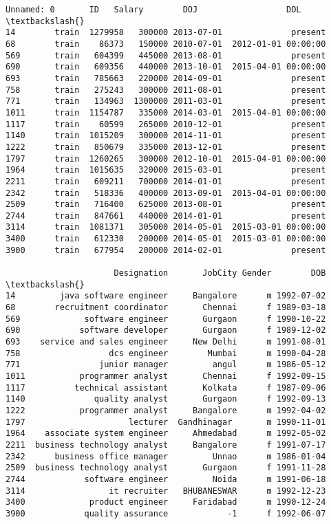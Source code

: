 \documentclass[11pt]{article}
\makeatletter
\newcommand{\boxspacing}{\kern\kvtcb@left@rule\kern\kvtcb@boxsep}
\newcommand{\prompt}[4]{
        \ttfamily\llap{{\color{#2}[#3]:\hspace{3pt}#4}}\vspace{-\baselineskip}
    }
\makeatother
\begin{document}
            \begin{tcolorbox}[breakable, size=fbox, boxrule=.5pt, pad at break*=1mm, opacityfill=0]
\prompt{Out}{outcolor}{46}{\boxspacing}
\begin{Verbatim}[commandchars=\\\{\}]
     Unnamed: 0       ID   Salary        DOJ                  DOL  \textbackslash{}
14        train  1279958   300000 2013-07-01              present
68        train    86373   150000 2010-07-01  2012-01-01 00:00:00
569       train   604399   445000 2013-08-01              present
690       train   609356   440000 2013-10-01  2015-04-01 00:00:00
693       train   785663   220000 2014-09-01              present
758       train   275243   300000 2011-08-01              present
771       train   134963  1300000 2011-03-01              present
1011      train  1154787   335000 2014-03-01  2015-04-01 00:00:00
1117      train    60599   265000 2010-12-01              present
1140      train  1015209   300000 2014-11-01              present
1222      train   850679   335000 2013-12-01              present
1797      train  1260265   300000 2012-10-01  2015-04-01 00:00:00
1964      train  1015635   320000 2015-03-01              present
2211      train   609211   700000 2014-01-01              present
2342      train   518336   400000 2013-09-01  2015-04-01 00:00:00
2509      train   716400   625000 2013-08-01              present
2744      train   847661   440000 2014-01-01              present
3114      train  1081371   305000 2014-05-01  2015-03-01 00:00:00
3400      train   612330   200000 2014-05-01  2015-03-01 00:00:00
3900      train   677954   200000 2014-02-01              present

                      Designation       JobCity Gender        DOB  \textbackslash{}
14         java software engineer     Bangalore      m 1992-07-02
68        recruitment coordinator       Chennai      f 1989-03-18
569             software engineer       Gurgaon      f 1990-10-22
690            software developer       Gurgaon      f 1989-12-02
693    service and sales engineer     New Delhi      m 1991-08-01
758                  dcs engineer        Mumbai      m 1990-04-28
771                junior manager         angul      m 1986-05-12
1011           programmer analyst       Chennai      f 1992-09-15
1117          technical assistant       Kolkata      f 1987-09-06
1140              quality analyst       Gurgaon      f 1992-09-13
1222           programmer analyst     Bangalore      m 1992-04-02
1797                     lecturer  Gandhinagar       m 1990-11-01
1964    associate system engineer     Ahmedabad      m 1992-05-02
2211  business technology analyst     Bangalore      f 1991-07-17
2342      business office manager         Unnao      m 1986-01-04
2509  business technology analyst       Gurgaon      f 1991-11-28
2744            software engineer         Noida      m 1991-06-18
3114                 it recruiter   BHUBANESWAR      m 1992-12-23
3400             product engineer     Faridabad      m 1990-12-24
3900            quality assurance            -1      f 1992-06-07


\end{Verbatim}
\end{tcolorbox}
\end{document}
